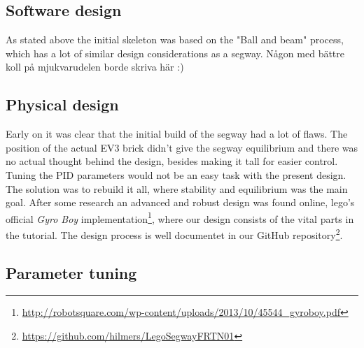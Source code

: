 \subsection{Software design}
As stated above the initial skeleton was based on the "Ball and beam" process, which has a lot of similar design considerations as a segway. Någon med bättre koll på mjukvarudelen borde skriva här :)

\subsection{Physical design}
Early on it was clear that the initial build of the segway had a lot of flaws. The position of the actual EV3 brick didn't give the segway equilibrium and there was no actual thought behind the design, besides making it tall for easier control. Tuning the PID parameters would not be an easy task with the present design. The solution was to rebuild it all, where stability and equilibrium was the main goal. After some research an advanced and robust design was found online, lego's official {\it Gyro Boy}   implementation\footnote{\url{http://robotsquare.com/wp-content/uploads/2013/10/45544_gyroboy.pdf}}, where our design consists of the vital parts in the tutorial. The design process is well documentet in our GitHub repository\footnote{\url{https://github.com/hilmers/LegoSegwayFRTN01}}.    

\subsection{Parameter tuning}

